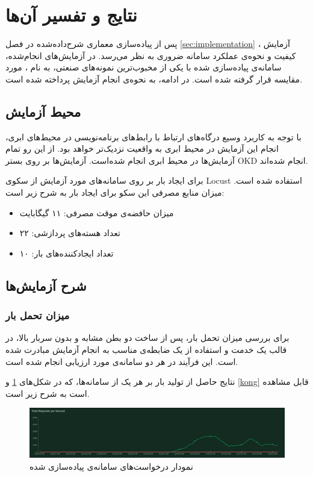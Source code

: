 \section{نتایج و تفسیر آن‌ها}\label{sec:results}
پس از پیاده‌سازی معماری شرح‌داده‌شده در فصل
\ref{sec:implementation}
، آزمایش کیفیت و نحوه‌ی عملکرد سامانه ضروری به نظر می‌رسد. در آزمایش‌های انجام‌شده، سامانه‌ی پیاده‌سازی شده با یکی از محبوب‌ترین نمونه‌های صنعتی، به نام ، مورد مقایسه قرار گرفته شده ‌است. در ادامه، به نحوه‌ی انجام آزمایش پرداخته شده است.


\subsection{محیط آزمایش}\label{subsec:results_env}
با توجه به کاربرد وسیع درگاه‌های ارتباط با رابط‌های برنامه‌نویسی در محیط‌های ابری، انجام این آزمایش در محیط ابری به واقعیت نزدیک‌تر خواهد بود. از این رو تمام آزمایش‌ها در محیط ابری انجام شده‌است. آزمایش‌ها بر روی بستر OKD
انجام شده‌اند.

برای ایجاد بار بر روی سامانه‌های مورد آزمایش از سکوی Locust استفاده شده است. میزان منابع مصرفی این سکو برای ایجاد بار به شرح زیر است:

\begin{itemize}
    \item میزان حافضه‌ی موقت مصرفی: ۱۱ گیگابایت
    \item تعداد هسته‌های پردازشی: ۲۲
    \item تعداد ایجاد‌کننده‌های بار: ۱۰
\end{itemize}

\subsection{شرح آزمایش‌ها}\label{subsec:results_tests}


\subsubsection{میزان تحمل بار}
برای بررسی میزان تحمل بار، پس از ساخت دو بطن مشابه و بدون سربار بالا، در قالب یک خدمت و استفاده از یک ضابطه‌ی مناسب به انجام آزمایش مبادرت شده است. این فرآیند در هر دو سامانه‌ی مورد ارزیابی انجام شده است.

نتایج حاصل از تولید‌ بار بر هر یک از سامانه‌ها، که در شکل‌های
\ref{highway}
و
\ref{kong}
قابل مشاهده است به شرح زیر است.

\begin{figure}[H]
    \centering
    \caption{نمودار درخواست‌های سامانه‌ی پیاده‌سازی شده}
    \label{highway}
    \includegraphics[scale=0.25]{images/HighwayStats.png}
\end{figure}

